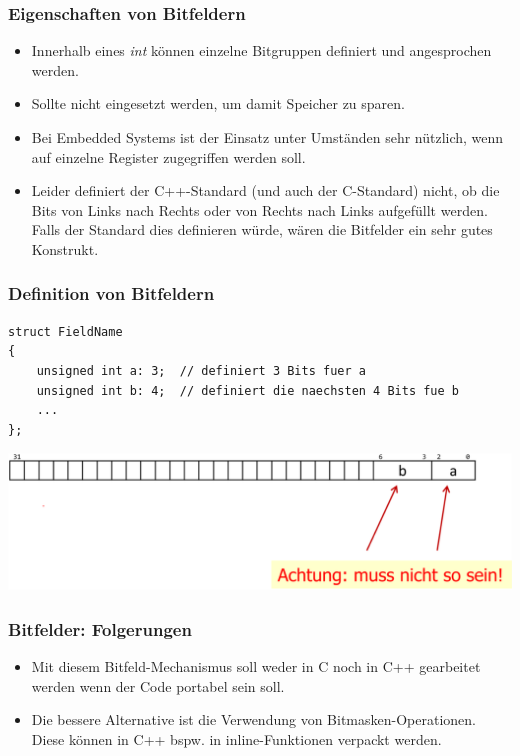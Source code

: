 \subsubsection{Eigenschaften von Bitfeldern}
\begin{itemize}
	\item Innerhalb eines \emph{int} können einzelne Bitgruppen definiert und angesprochen werden.
	\item Sollte nicht eingesetzt werden, um damit Speicher zu sparen.
	\item Bei Embedded Systems ist der Einsatz unter Umständen sehr nützlich, wenn auf einzelne Register zugegriffen werden soll.
	\item[\-]\begin{achtung}
		Leider definiert der C++-Standard (und auch der C-Standard) nicht, ob die Bits von Links nach Rechts oder von Rechts nach Links aufgefüllt werden. Falls der Standard dies definieren würde, wären die Bitfelder ein sehr gutes Konstrukt.
	\end{achtung}
\end{itemize}

\subsubsection{Definition von Bitfeldern}
\vspace{-\baselineskip}
\begin{minipage}{\linewidth}
\begin{lstlisting}
struct FieldName
{
	unsigned int a: 3;	// definiert 3 Bits fuer a
	unsigned int b: 4;	// definiert die naechsten 4 Bits fue b
	...
};
\end{lstlisting}
\end{minipage}
\begin{minipage}{0.8\linewidth}
\includegraphics[width=\linewidth]{images/bitfelder.png}
\end{minipage}

\subsubsection{Bitfelder: Folgerungen}
\begin{itemize}
	\item Mit diesem Bitfeld-Mechanismus soll weder in C noch in C++ gearbeitet werden wenn der Code portabel sein soll.
	\item Die bessere Alternative ist die Verwendung von Bitmasken-Operationen. Diese können in C++ bspw. in inline-Funktionen verpackt werden.
\end{itemize}

